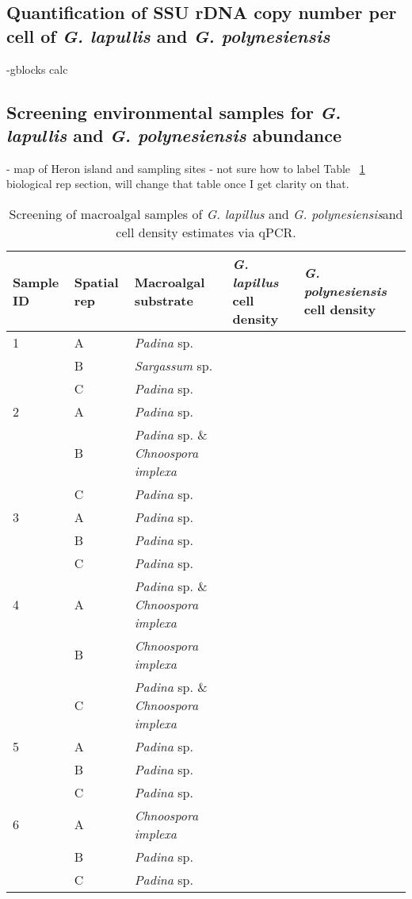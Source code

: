 \documentclass[12pt]{article}
\begin{document}
\subsection{Quantification of SSU rDNA copy number per cell of \emph{G. lapullis} and \emph{G. polynesiensis}}
-gblocks calc
\subsection{Screening environmental samples for \emph{G. lapullis} and \emph{G. polynesiensis} abundance}
- map of Heron island and sampling sites
- not sure how to label Table ~\ref{tbl:MacroalgaeTable} biological rep section, will change that table once I get clarity on that.
\FloatBarrier
\begin{longtable}{ | p{1cm} | p{1cm} | p{3cm} | p{4cm} | p{4cm} | }
\caption{Screening of macroalgal samples of \emph{G. lapillus} and \emph{G. polynesiensis}and cell density estimates via qPCR.}\\
\hline
\label{tbl:MacroalgaeTable}
\textbf{Sample ID}&\textbf{Spatial rep}&\textbf{Macroalgal substrate}&\textbf{\textit{G. lapillus} cell density}&\textbf{\textit{G. polynesiensis} cell density}\\
\hline
1&A&\emph{Padina} sp.&&\\
\hline
&B&\emph{Sargassum} sp.&&\\
\hline
&C&\emph{Padina} sp.&&\\
\hline
2&A&\emph{Padina} sp.&&\\
\hline
&B&\emph{Padina} sp. \& \emph{Chnoospora implexa}&&\\
\hline
&C&\emph{Padina} sp.&&\\
\hline
3&A&\emph{Padina} sp.&&\\
\hline
&B&\emph{Padina} sp.&&\\
\hline
&C&\emph{Padina} sp.&&\\
\hline
4&A&\emph{Padina} sp. \& \emph{Chnoospora implexa}&&\\
\hline
&B&\emph{Chnoospora implexa}&&\\
\hline
&C&\emph{Padina} sp. \& \emph{Chnoospora implexa}&&\\
\hline
5&A&\emph{Padina} sp.&&\\
\hline
&B&\emph{Padina} sp.&&\\
\hline
&C&\emph{Padina} sp.&&\\
\hline
6&A&\emph{Chnoospora implexa}&&\\
\hline
&B&\emph{Padina} sp.&&\\
\hline
&C&\emph{Padina} sp.&&\\

\end{longtable}
\end{document}

